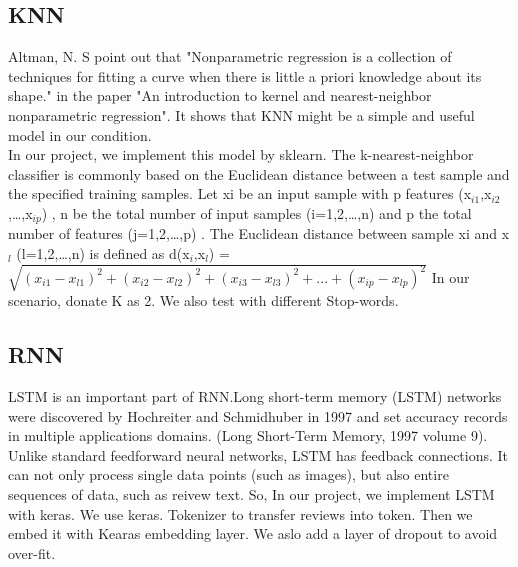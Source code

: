 \documentclass{article}
\begin{document}
\subsection{KNN}
Altman, N. S point out that "Nonparametric regression is a collection of techniques for fitting a curve when there is little a priori knowledge about its shape." in the paper "An introduction to kernel and nearest-neighbor nonparametric regression". It shows that KNN might be a simple and useful model in our condition.\\[2]
In our project, we implement this model by sklearn. The k-nearest-neighbor classifier is commonly based on the Euclidean distance between a test sample and the specified training samples. Let xi be an input sample with p features (x$_{i1}$,x$_{i2}$,…,x$_{ip}$) , n be the total number of input samples (i=1,2,…,n) and p the total number of features (j=1,2,…,p) . The Euclidean distance between sample xi and x$_{l}$ (l=1,2,…,n) is defined as d(x$_{i}$,x$_{l}$) = $\sqrt{(x_{i1}-x_{l1})^{2} +(x_{i2}-x_{l2})^{2} + (x_{i3}-x_{l3})^{2} + ... + (x_{ip}-x_{lp})^{2}}$
In our scenario, donate K as 2. We also test with different Stop-words.
\subsection{RNN}
LSTM is an important part of RNN.Long short-term memory (LSTM) networks were discovered by Hochreiter and Schmidhuber in 1997 and set accuracy records in multiple applications domains. (Long Short-Term Memory, 1997 volume 9). \\[2]
Unlike standard feedforward neural networks, LSTM has feedback connections. It can not only process single data points (such as images), but also entire sequences of data, such as reivew text.
So, In our project, we implement LSTM with keras. We use keras. Tokenizer to transfer reviews into token. Then we embed it with Kearas embedding layer. We aslo add a layer of dropout to avoid over-fit.
\end{document}

